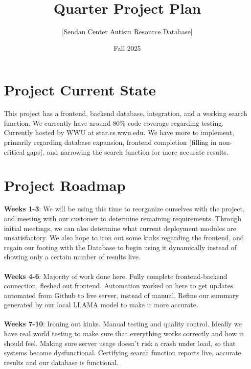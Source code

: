 \documentclass{article}
\title{Quarter Project Plan}
\author{[Sendan Center Autism Resource Database]}
\date{Fall 2025}
\begin{document}
\maketitle


\section*{Project Current State}
This project has a frontend, backend database, integration, and a working search function. We currently have around 80\% code coverage regarding testing. Currently hosted by WWU at star.cs.wwu.edu. We have more to implement, primarily regarding database expansion, frontend completion (filling in non-critical gaps), and narrowing the search function for more accurate results.

\section*{Project Roadmap}
\textbf{Weeks 1-3}: We will be using this time to reorganize ourselves with the project, and meeting with our customer to determine remaining requirements. Through initial meetings, we can also determine what current deployment modules are unsatisfactory. We also hope to iron out some kinks regarding the frontend, and regain our footing with the Database to begin using it dynamically instead of showing only a certain number of results live. 
\\\\
\textbf{Weeks 4-6}: Majority of work done here. Fully complete frontend-backend connection, fleshed out frontend. Automation worked on here to get updates automated from Github to live server, instead of manual. Refine our summary generated by our local LLAMA model to make it more accurate. 
\\\\
\textbf{Weeks 7-10}: Ironing out kinks. Manual testing and quality control. Ideally we have real world testing to make sure that everything works correctly and how it should feel. Making sure server usage doesn't risk a crash under load, so that systems become dysfunctional. Certifying search function reports live, accurate results and our database is functional.
\end{document}
